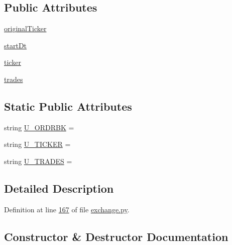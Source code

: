 \subsection*{Public Attributes}
\begin{DoxyCompactItemize}
\item 
\hyperlink{classexchange_1_1_exchange_ae326ce8c325672f3f555af59f22fd9f6}{original\+Ticker}
\item 
\hyperlink{classexchange_1_1_exchange_a62e9159cbcc09db3c06b1b5622da39d4}{start\+Dt}
\item 
\hyperlink{classexchange_1_1_exchange_a7cf9e52f993627955a2e242c388daaeb}{ticker}
\item 
\hyperlink{classexchange_1_1_exchange_a30e87a377320ce05bd956fb014683641}{trades}
\end{DoxyCompactItemize}
\subsection*{Static Public Attributes}
\begin{DoxyCompactItemize}
\item 
string \hyperlink{classexchange_1_1_exchange_a83174d2fe96a1c737231d3b8b18d9807}{U\+\_\+\+O\+R\+D\+R\+BK} = \textquotesingle{}\textquotesingle{}
\item 
string \hyperlink{classexchange_1_1_exchange_ab16df02480d727c533b02b5b7afa053b}{U\+\_\+\+T\+I\+C\+K\+ER} = \textquotesingle{}\textquotesingle{}
\item 
string \hyperlink{classexchange_1_1_exchange_aafa0e023de170f51cbf9d48e1154587a}{U\+\_\+\+T\+R\+A\+D\+ES} = \textquotesingle{}\textquotesingle{}
\end{DoxyCompactItemize}


\subsection{Detailed Description}


Definition at line \hyperlink{exchange_8py_source_l00167}{167} of file \hyperlink{exchange_8py_source}{exchange.\+py}.



\subsection{Constructor \& Destructor Documentation}
\mbox{\label{classexchange_1_1_exchange_adc6345bd84ea113d46f4e044dbd4d0fb}} 

